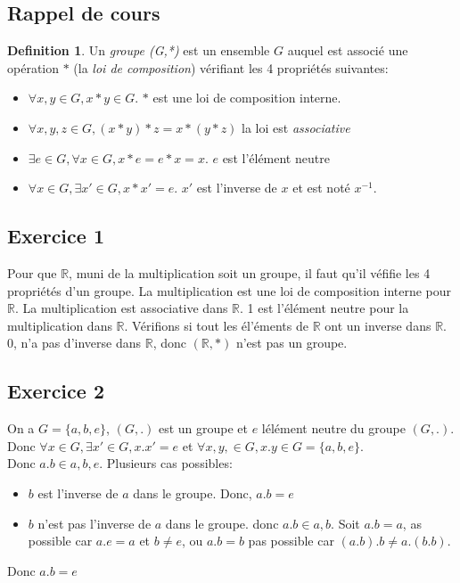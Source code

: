 \documentclass[]{book}
\theoremstyle{definition}
\newtheorem{defn}{Definition}
\newcommand{\bb}[1]{\mathbb{#1}}
\newcommand{\R}{\bb{R}}
\begin{document}
\subsection*{Rappel de cours}
\begin{defn}
Un \emph{groupe (G,*)} est un ensemble $G$ auquel est associ\'e une op\'eration $*$ (la \emph{loi de composition}) v\'erifiant les 4 propri\'et\'es suivantes:
\begin{itemize}
\item $\forall x, y \in G, x * y \in G$. $*$ est une loi de composition interne.
\item $\forall x, y, z \in G, (x * y) * z = x * (y * z)$ la loi est \emph{associative}
\item $\exists e \in G, \forall x \in G, x * e = e * x = x$. $e$ est l'\'el\'ement neutre
\item $\forall x \in G, \exists x' \in G, x * x' = e$. $x'$ est l'inverse de $x$ et est not\'e $x^{-1}$. 
\end{itemize}
\end{defn}

\newpage
\subsection*{Exercice 1}
Pour que $\R$, muni de la multiplication soit un groupe, il faut qu'il v\'efifie les 4 propri\'et\'es d'un groupe. La multiplication est une loi de composition interne pour $\R$. La multiplication est associative dans $\R$. 1 est l'\'el\'ement neutre pour la multiplication dans $\R$. V\'erifions si tout les \'el'\'ements de $\R$ ont un inverse dans $\R$. 
0, n'a pas d'inverse dans $\R$, donc $(\R,*)$ n'est pas un groupe.

\subsection*{Exercice 2}
On a $G=\{a,b,e\}$, $(G,.)$ est un groupe et $e$ l\'el\'ement neutre du groupe $(G,.)$. Donc $\forall x \in G, \exists x' \in G, x . x' = e$ et $\forall x, y, \in G, x.y \in G = \{a,b,e\}$. \\
Donc $a.b \in {a,b,e}$. Plusieurs cas possibles:
\begin{itemize}
\item $b$ est l'inverse de $a$ dans le groupe. Donc, $a.b = e$
\item $b$ n'est pas l'inverse de $a$ dans le groupe. donc $a.b \in {a,b}$. Soit $a.b = a$, as possible car $a.e=a$ et $b \neq e$, ou $a.b=b$ pas possible car $(a.b).b \neq a.(b.b)$.
\end{itemize}
Donc $a.b = e$
\end{document}
